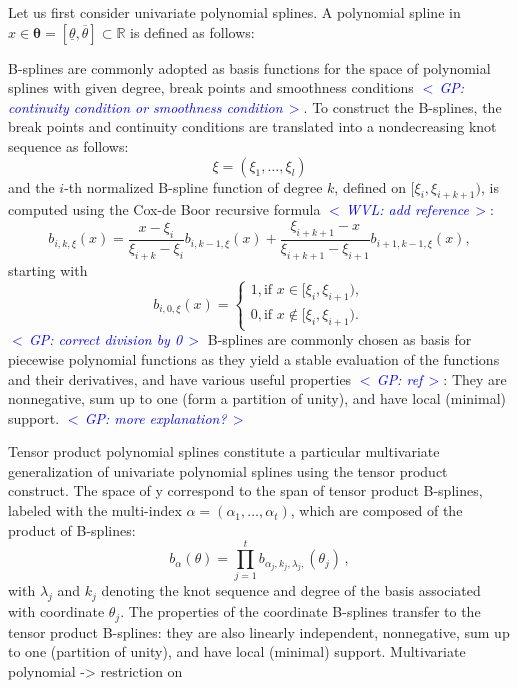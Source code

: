\documentclass{article}
\newcommand{\commentGP}[1]{\noindent \textcolor{blue}{\emph{$<\,$GP: #1$\,>$}}}%
\newcommand{\commentWVL}[1]{\noindent \textcolor{blue}{\emph{$<\,$WVL: #1$\,>$}}}%
\newcommand{\R}{\mathbb{R}}         %
\newcommand{\ppar}{\theta}                          %
\newcommand{\Ppar}{{\bm{\theta}}}                   %
\newcommand{\pparL}{\underline{\ppar}}
\newcommand{\pparU}{\overline{\ppar}}
\begin{document}
Let us first consider univariate polynomial splines. A polynomial spline in $x\in\Ppar=[\pparL,\pparU]\subset\R$ is defined as follows:

B-splines are commonly adopted as basis functions for the space of polynomial splines with given degree, break points and smoothness  conditions \commentGP{continuity condition or smoothness condition}. To construct the B-splines, the break points and continuity conditions are translated into a nondecreasing knot sequence as follows:
\[
    \xi = (\xi_1, \ldots, \xi_l)
\]
and the $i$-th normalized B-spline function of degree $k$, defined on $[\xi_i, \xi_{i+k+1})$, is computed using the Cox-de Boor recursive formula
\commentWVL{add reference}:
\[
    b_{i,k,\xi}(x) = \frac{x-\xi_i}{\xi_{i+k} - \xi_i}
    b_{i,k-1,\xi}(x) +
    \frac{\xi_{i+k+1}-x}{\xi_{i+k+1} - \xi_{i+1}}
    b_{i+1,k-1,\xi}(x) ,
\]
starting with
\[
    b_{i,0,\xi}(x)  =
    \begin{cases}
        1 , \text{if } x \in [\xi_i , \xi_{i+1} ) , \\
        0, \text{if } x \notin [\xi_i , \xi_{i+1} ) .
    \end{cases}
\]
\commentGP{correct division by 0} B-splines are commonly chosen as basis for piecewise polynomial functions as they yield a stable evaluation of the functions and their derivatives, and have various useful properties \commentGP{ref}: They are nonnegative, sum up to one (form a partition of unity), and have local (minimal) support. \commentGP{more explanation?}


Tensor product polynomial splines constitute a particular multivariate  generalization of univariate polynomial splines using the tensor product construct. The space of y correspond to the span of tensor product B-splines, labeled with the multi-index $\alpha=(\alpha_1, \ldots, \alpha_t)$, which are composed of the product of B-splines:
\[ b_\alpha(\ppar) = \prod_{j=1}^t b_{\alpha_j, k_j, \lambda_j,}(\ppar_j) \,,%
\]
with $\lambda_j$ and $k_j$ denoting the knot sequence and degree of the basis associated with coordinate $\ppar_j$. The properties of the coordinate B-splines transfer to the tensor product B-splines: they are also linearly independent, nonnegative, sum up to one (partition of unity), and have local (minimal) support. Multivariate polynomial -> restriction on 
\end{document}
